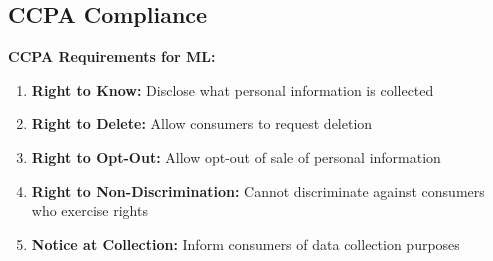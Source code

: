 \subsection{CCPA Compliance}

\textbf{CCPA Requirements for ML:}

\begin{enumerate}
    \item \textbf{Right to Know:} Disclose what personal information is collected
    \item \textbf{Right to Delete:} Allow consumers to request deletion
    \item \textbf{Right to Opt-Out:} Allow opt-out of sale of personal information
    \item \textbf{Right to Non-Discrimination:} Cannot discriminate against consumers who exercise rights
    \item \textbf{Notice at Collection:} Inform consumers of data collection purposes
\end{enumerate}

